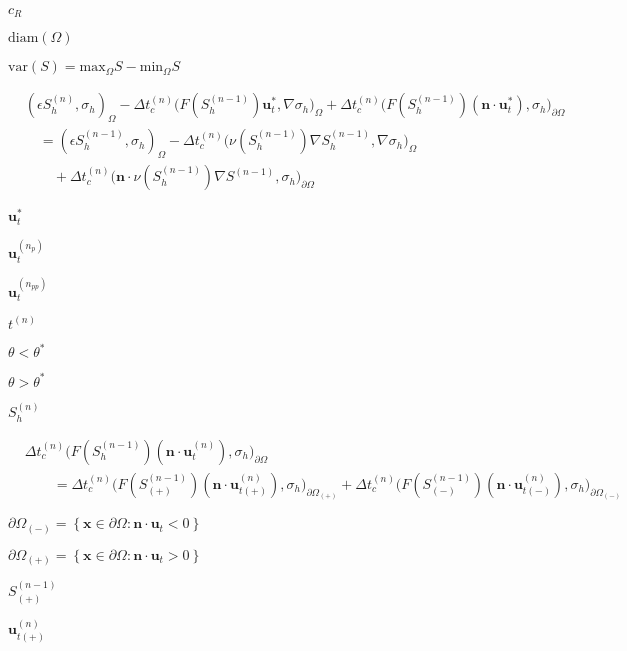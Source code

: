 \documentclass{article}
\begin{document}
$c_R$
\pagebreak

$\textrm{diam}(\Omega)$
\pagebreak

$\textrm{var}(S) = \textrm{max}_{\Omega} S - \textrm{min}_{\Omega} S$
\pagebreak

\begin{align*} &\left( \epsilon S_h^{(n)},\sigma_h\right)_{\Omega} - \Delta t^{(n)}_c \Big(F\left(S_h^{(n-1)}\right)\mathbf{u}^{*}_t,\nabla\sigma_h\Big)_{\Omega} + \Delta t^{(n)}_c \Big(F\left(S_h^{(n-1)}\right)\left(\mathbf{n}\cdot\mathbf{u}^{*}_t\right),\sigma_h\Big)_{\partial\Omega} \nonumber \\ & \quad = \left( \epsilon S_h^{(n-1)},\sigma_h\right)_{\Omega} - \Delta t^{(n)}_c \bigg(\nu\left(S_h^{(n-1)}\right)\nabla S_h^{(n-1)},\nabla\sigma_h\bigg)_{\Omega} \nonumber \\ & \qquad + \Delta t^{(n)}_c \bigg(\mathbf{n}\cdot\nu\left(S_h^{(n-1)}\right)\nabla S^{(n-1)},\sigma_h\bigg)_{\partial\Omega} \end{align*}
\pagebreak

$\mathbf{u}_t^{*}$
\pagebreak

$\mathbf{u}^{(n_p)}_t$
\pagebreak

$\mathbf{u}^{(n_{pp})}_t$
\pagebreak

$t^{(n)}$
\pagebreak

$\theta<\theta^*$
\pagebreak

$\theta>\theta^*$
\pagebreak

$S_h^{(n)}$
\pagebreak

\begin{align*} &\Delta t^{(n)}_c \Big(F\left(S_h^{(n-1)}\right)\left(\mathbf{n}\cdot\mathbf{u}^{(n)}_t\right),\sigma_h\Big)_{\partial\Omega} \nonumber \\ &\qquad= \Delta t^{(n)}_c \Big(F\left(S^{(n-1)}_{(+)}\right)\left(\mathbf{n}\cdot\mathbf{u}^{(n)}_{t(+)}\right),\sigma_h\Big)_{\partial\Omega_{(+)}} + \Delta t^{(n)}_c \Big(F\left(S^{(n-1)}_{(-)}\right)\left(\mathbf{n}\cdot\mathbf{u}^{(n)}_{t(-)}\right),\sigma_h\Big)_{\partial\Omega_{(-)}} \end{align*}
\pagebreak

$\partial\Omega_{(-)} = \left\{\mathbf{x} \in \partial\Omega : \mathbf{n} \cdot \mathbf{u}_t<0\right\}$
\pagebreak

$\partial\Omega_{(+)} = \left\{\mathbf{x} \in \partial\Omega : \mathbf{n} \cdot \mathbf{u}_t>0\right\}$
\pagebreak

$S^{(n-1)}_{(+)}$
\pagebreak

$\mathbf{u}^{(n)}_{t(+)}$
\pagebreak
\end{document}
